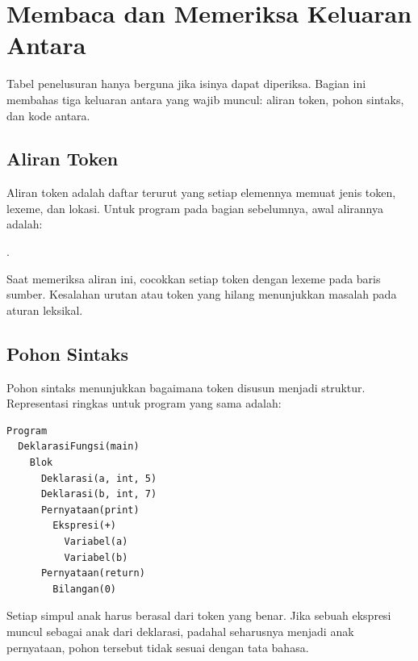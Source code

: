 \section{Membaca dan Memeriksa Keluaran Antara}
\label{sec:ch03-runtime}

Tabel penelusuran hanya berguna jika isinya dapat diperiksa. Bagian
ini membahas tiga keluaran antara yang wajib muncul: aliran token,
pohon sintaks, dan kode antara.

\subsection{Aliran Token}

Aliran token adalah daftar terurut yang setiap elemennya memuat jenis
token, lexeme, dan lokasi. Untuk program pada bagian sebelumnya,
awal alirannya adalah:

\begin{center}
\small
{}   
   
   
   
   
   
  .
\end{center}

Saat memeriksa aliran ini, cocokkan setiap token dengan lexeme pada
baris sumber. Kesalahan urutan atau token yang hilang menunjukkan
masalah pada aturan leksikal.

\subsection{Pohon Sintaks}

Pohon sintaks menunjukkan bagaimana token disusun menjadi struktur.
Representasi ringkas untuk program yang sama adalah:

\begin{verbatim}
Program
  DeklarasiFungsi(main)
    Blok
      Deklarasi(a, int, 5)
      Deklarasi(b, int, 7)
      Pernyataan(print)
        Ekspresi(+)
          Variabel(a)
          Variabel(b)
      Pernyataan(return)
        Bilangan(0)
\end{verbatim}

Setiap simpul anak harus berasal dari token yang benar. Jika sebuah
ekspresi muncul sebagai anak dari deklarasi, padahal seharusnya menjadi
anak pernyataan, pohon tersebut tidak sesuai dengan tata bahasa.

